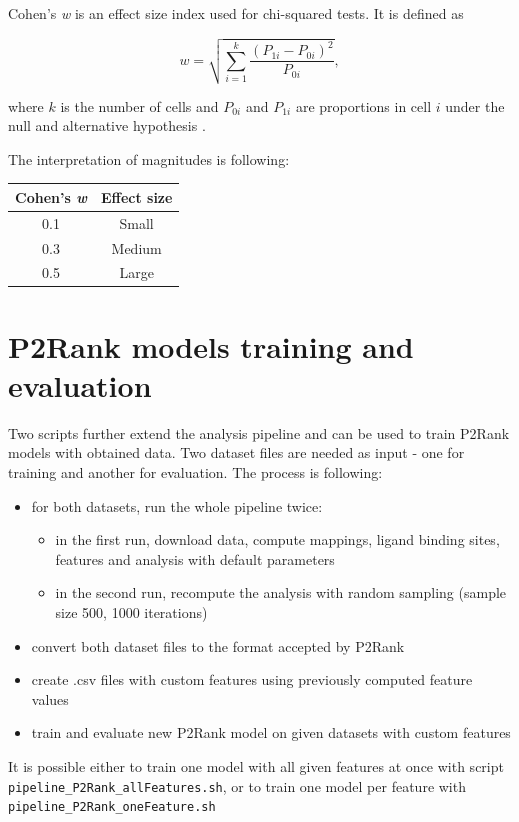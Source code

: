 Cohen's \textit{w} is an effect size index used for chi-squared tests. It is defined as

\begin{equation}
w = \sqrt{\sum\limits_{i=1}^k {\frac{\left( P_{1i}-P_{0i} \right)^2}{P_{0i}}}} ,
\end{equation}

where $k$ is the number of cells and $P_{0i}$ and $P_{1i}$ are proportions in cell $i$ under the null and alternative hypothesis \cite{cohen_book}.

The interpretation of magnitudes is following:

\begin{table}[!h] \centering
\begin{tabular}{cc}
\hline
Cohen's \textit{w} & Effect size \\ \hline
0.1                & Small       \\
0.3                & Medium      \\
0.5                & Large       \\ \hline
\end{tabular}
\end{table}

\section{P2Rank models training and evaluation}

Two scripts further extend the analysis pipeline and can be used to train P2Rank models with obtained data. Two dataset files are needed as input - one for training and another for evaluation. The process is following:

\begin{itemize}
\item for both datasets, run the whole pipeline twice:
	\begin{itemize}
	\item in the first run, download data, compute mappings, ligand binding sites, features and analysis with default parameters
	\item in the second run, recompute the analysis with random sampling (sample size 500, 1000 iterations)
	\end{itemize}
\item convert both dataset files to the format accepted by P2Rank
\item create .csv files with custom features using previously computed feature values
\item train and evaluate new P2Rank model on given datasets with custom features
\end{itemize}

It is possible either to train one model with all given features at once with script \texttt{pipeline\_P2Rank\_allFeatures.sh}, or to train one model per feature with \texttt{pipeline\_P2Rank\_oneFeature.sh}


